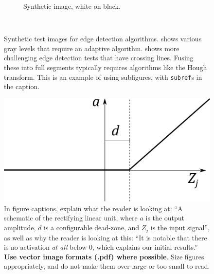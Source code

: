\documentclass{l4proj}
\begin{document}
\begin{figure}
\begin{subfigure}[b]{0.45\textwidth}
        \caption{Synthetic image, white on black.}
        \label{fig:syn2}
    \end{subfigure}
    ~ %
    \caption{Synthetic test images for edge detection algorithms.  shows various gray levels that require an adaptive algorithm. 
    shows more challenging edge detection tests that have crossing lines. Fusing these into full segments typically requires algorithms like the Hough transform.
    This is an example of using subfigures, with \texttt{subref}s in the caption.
    }\label{fig:synthetic}
\end{figure}



\begin{figure}
    \centering
    \includegraphics[width=0.5\linewidth]{images/relu.pdf}    

    \caption{In figure captions, explain what the reader is looking at: ``A schematic of the rectifying linear unit, where $a$ is the output amplitude,
    $d$ is a configurable dead-zone, and $Z_j$ is the input signal'', as well as why the reader is looking at this: 
    ``It is notable that there is no activation \emph{at all} below 0, which explains our initial results.'' 
    \textbf{Use vector image formats (.pdf) where possible}. Size figures appropriately, and do not make them over-large or too small to read.
    }

    \label{fig:relu} 
\end{figure}






\end{document}
